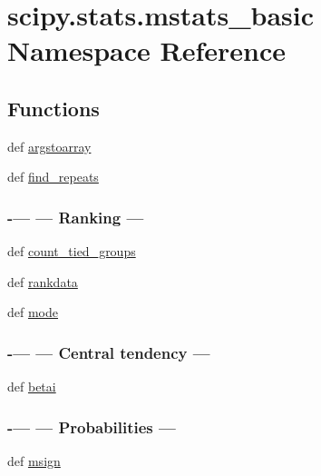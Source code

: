 \hypertarget{namespacescipy_1_1stats_1_1mstats__basic}{}\section{scipy.\+stats.\+mstats\+\_\+basic Namespace Reference}
\label{namespacescipy_1_1stats_1_1mstats__basic}
\subsection*{Functions}
\begin{DoxyCompactItemize}
\item 
def \hyperlink{namespacescipy_1_1stats_1_1mstats__basic_a0ad15547890ea66498caa473f13fb184}{argstoarray}
\item 
def \hyperlink{namespacescipy_1_1stats_1_1mstats__basic_a61ebce7d9485940ccfa9988eb49011e5}{find\+\_\+repeats}
\begin{DoxyCompactList}\small\item\em 

 \subsubsection*{-\/--- --- Ranking --- }\end{DoxyCompactList}\item 
def \hyperlink{namespacescipy_1_1stats_1_1mstats__basic_ae97846eb23fb8eacade01b75fe9fa5dc}{count\+\_\+tied\+\_\+groups}
\item 
def \hyperlink{namespacescipy_1_1stats_1_1mstats__basic_aa89ba3af7409dec5ea84974606207cf7}{rankdata}
\item 
def \hyperlink{namespacescipy_1_1stats_1_1mstats__basic_a5da6ab6d6a72889a86658849b207b4e3}{mode}
\begin{DoxyCompactList}\small\item\em 

 \subsubsection*{-\/--- --- Central tendency --- }\end{DoxyCompactList}\item 
def \hyperlink{namespacescipy_1_1stats_1_1mstats__basic_a28df5938959bc16b505110d58745a838}{betai}
\begin{DoxyCompactList}\small\item\em 

 \subsubsection*{-\/--- --- Probabilities --- }\end{DoxyCompactList}\item 
def \hyperlink{namespacescipy_1_1stats_1_1mstats__basic_afda03b38f8c5762725c5158b16bac71a}{msign}
\begin{DoxyCompactList}\small\item\em 


\end{DoxyCompactList}
\end{DoxyCompactItemize}
